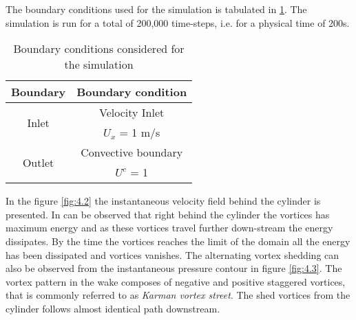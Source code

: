 The boundary conditions used for the simulation is tabulated in \ref{table:4.2}. The simulation is run for a total of 200,000 time-steps, i.e. for a physical time of 200s. 

\begin{table} [H]
\centering
	\begin{tabular}{|c|c|}
	\hline 
	Boundary  & Boundary condition \tabularnewline
	\hline 
	\multirow{2}{*}{Inlet} & Velocity Inlet \tabularnewline
	\cline{2-2} 
	 & $U_{x}$ = 1 m/s \tabularnewline
	\hline 
	\multirow{2}{*}{Outlet} & Convective boundary \tabularnewline
	\cline{2-2} 
	 & $U^{c}$ = 1\tabularnewline
	\hline 
	\end{tabular}
\caption{Boundary conditions considered for the simulation}
\label{table:4.2}
\end{table}

In the figure \ref{fig:4.2} the instantaneous velocity field behind the cylinder is presented. In can be observed that right behind the cylinder the vortices has maximum energy and as these vortices travel further down-stream the energy dissipates. By the time the vortices reaches the limit of the domain all the energy has been dissipated and vortices vanishes. The alternating vortex shedding can also be
observed from the instantaneous pressure contour in figure \ref{fig:4.3}. The vortex pattern in the wake composes of negative and positive staggered vortices, that is commonly referred to as \textit{Karman vortex street}. The shed vortices from the cylinder follows almost identical path downstream.  

%	
%	

